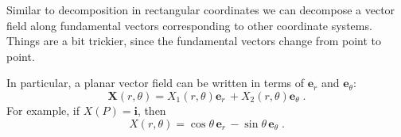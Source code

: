 \begin{frame}
Similar to decomposition in rectangular coordinates we can decompose a vector field along fundamental vectors corresponding to other coordinate systems. Things are a bit trickier, since the fundamental vectors change from
point to point.

In particular, a planar vector field can be written in terms of
$\textbf{e}_r$ and $\textbf{e}_\theta$:
%
$$\textbf{X}(r,\theta) = X_1(r,\theta) \textbf{e}_r\, +
X_2(r,\theta) \textbf{e}_\theta\; .$$
%
For example, if $X(P) = \textbf{i}$, then
%
$$X(r,\theta) = \cos\theta \,\textbf{e}_r\,
-\sin\theta \, \textbf{e}_\theta\; .$$
\end{frame}